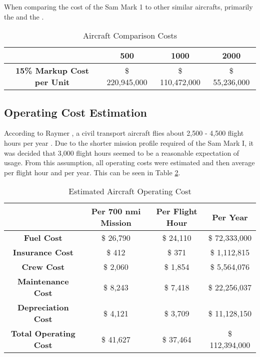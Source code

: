 When comparing the cost of the Sam Mark 1 to other similar aircrafts, primarily the  and the . 


\begin{table}[!h]
    \centering
        \caption{Aircraft Comparison Costs}
    \begin{tabular}{|c||c|c|c|}\toprule
         & \textbf{500} & \textbf{1000} & \textbf{2000} \\\hline \hline
         \textbf{15\% Markup Cost per Unit} &  \$ 220,945,000 &  \$ 110,472,000 &  \$ 55,236,000 \\\bottomrule
    \end{tabular}
    \label{tab:prodcost}
\end{table}

\subsection{Operating Cost Estimation}

According to Raymer \cite{raymer}, a civil transport aircraft flies about 2,500 - 4,500 flight hours per year \cite{raymer}. Due to the shorter mission profile required of the Sam Mark I, it was decided that 3,000 flight hours seemed to be a reasonable expectation of usage. From this assumption, all operating costs were estimated and then average per flight hour and per year. This can be seen in Table \ref{tab:opcost}.

\begin{table}[!h]
    \centering
        \caption{Estimated Aircraft Operating Cost}
    \begin{tabular}{|c||c|c|c|}\toprule
         & \textbf{Per 700 nmi Mission} & \textbf{Per Flight Hour} & \textbf{Per Year} \\\hline \hline
         \textbf{Fuel Cost} & \$ 26,790 & \$ 24,110 & \$ 72,333,000 \\ \hline
         \textbf{Insurance Cost} & \$ 412 & \$ 371 & \$ 1,112,815 \\ \hline
         \textbf{Crew Cost} &  \$ 2,060  & \$ 1,854 & \$ 5,564,076 \\ \hline
         \textbf{Maintenance Cost} & \$ 8,243 & \$ 7,418 & \$ 22,256,037  \\ \hline
         \textbf{Depreciation Cost} & \$ 4,121 & \$ 3,709 & \$ 11,128,150  \\ \hline
         \textbf{Total Operating Cost} &  \$ 41,627 &  \$ 37,464 &  \$ 112,394,000 \\\bottomrule
    \end{tabular}
    \label{tab:opcost}
\end{table}


